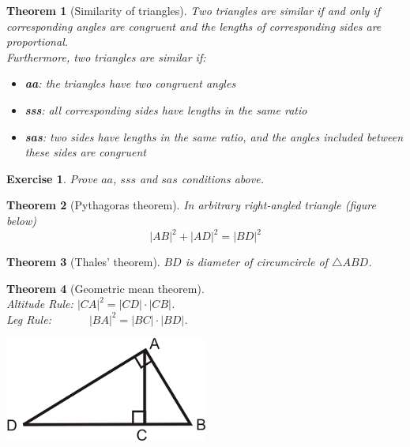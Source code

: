 \documentclass[11pt,a5paper]{article}
\newtheorem{exercise}{Exercise}
\newtheorem*{Theorem}{Theorem}
\begin{document}
\begin{Theorem}[Similarity of triangles]
Two triangles are similar if and only if corresponding angles are congruent and the lengths of corresponding sides are proportional. \\
Furthermore, two triangles are similar if:
\begin{itemize}
\item{\textbf{aa}: the triangles have two congruent angles}
\item{\textbf{sss}: all corresponding sides have lengths in the same ratio}
\item{\textbf{sas}: two sides have lengths in the same ratio, and the angles included between these sides are congruent}
\end{itemize}
\end{Theorem}

\begin{exercise}
Prove $aa$, $sss$ and $sas$ conditions above.
\end{exercise}


\begin{Theorem}[Pythagoras theorem]
	In arbitrary right-angled triangle (figure below) \[|AB|^2 + |AD|^2 = |BD|^2\]
\end{Theorem}
\begin{Theorem}[Thales' theorem]
	$BD$ is diameter of circumcircle of $\triangle ABD$.
\end{Theorem}
\begin{Theorem}[Geometric mean theorem]
	\ \\Altitude Rule: $|CA|^2 = |CD| \cdot |CB|$.\\
	Leg Rule: \ \ \ \ \ \  $|BA|^2 = |BC| \cdot |BD|$.
\end{Theorem}

\begin{center}
\includegraphics[width=0.5\textwidth]{right}
\end{center}
\end{document}
